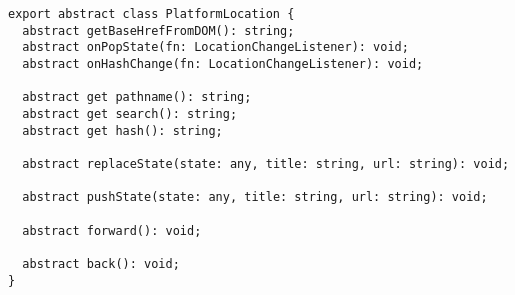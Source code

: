 \begin{verbatim}
export abstract class PlatformLocation {
  abstract getBaseHrefFromDOM(): string;
  abstract onPopState(fn: LocationChangeListener): void;
  abstract onHashChange(fn: LocationChangeListener): void;

  abstract get pathname(): string;
  abstract get search(): string;
  abstract get hash(): string;

  abstract replaceState(state: any, title: string, url: string): void;

  abstract pushState(state: any, title: string, url: string): void;

  abstract forward(): void;

  abstract back(): void;
}
\end{verbatim}
